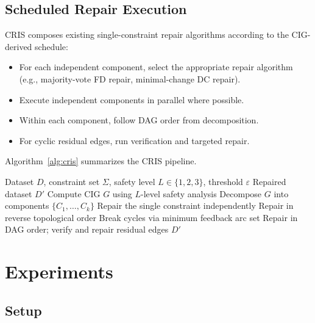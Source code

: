 \documentclass{article}
\newcommand{\cris}{\textsc{CRIS}\xspace}
\begin{document}
\subsection{Scheduled Repair Execution}
\label{sec:schedule}

\cris composes existing single-constraint repair algorithms according to the CIG-derived schedule:
\begin{itemize}
  \item For each independent component, select the appropriate repair algorithm (e.g., majority-vote FD repair, minimal-change DC repair).
  \item Execute independent components in parallel where possible.
  \item Within each component, follow DAG order from decomposition.
  \item For cyclic residual edges, run verification and targeted repair.
\end{itemize}

Algorithm~\ref{alg:cris} summarizes the \cris pipeline.

\begin{algorithm}[t]
\caption{\cris: Constraint Interaction-aware Repair Scheduling}
\label{alg:cris}
\begin{algorithmic}[1]
\REQUIRE Dataset $D$, constraint set $\Sigma$, safety level $L \in \{1,2,3\}$, threshold $\varepsilon$
\ENSURE Repaired dataset $D'$
\STATE Compute CIG $G$ using $L$-level safety analysis
\STATE Decompose $G$ into components $\{C_1, \ldots, C_k\}$
    \STATE Repair the single constraint independently
    \STATE Repair in reverse topological order
  \ELSE
    \STATE Break cycles via minimum feedback arc set
    \STATE Repair in DAG order; verify and repair residual edges
  \ENDIF
\ENDFOR
\RETURN $D'$
\end{algorithmic}
\end{algorithm}


\section{Experiments}
\label{sec:experiments}

\subsection{Setup}
\label{sec:setup}
\end{document}

